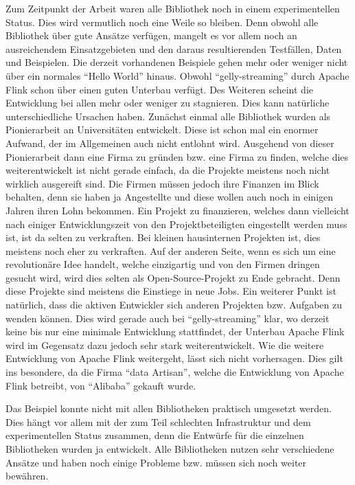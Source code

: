 Zum Zeitpunkt der Arbeit waren alle Bibliothek noch in einem experimentellen
Status. Dies wird vermutlich noch eine Weile so bleiben. Denn obwohl alle
Bibliothek über gute Ansätze verfügen, mangelt es vor allem noch an ausreichendem
Einsatzgebieten und den daraus resultierenden Testfällen, Daten und Beispielen.
Die derzeit vorhandenen Beispiele gehen mehr oder weniger nicht über ein normales
\enquote{Hello World} hinaus. Obwohl \enquote{gelly-streaming} durch Apache Flink
schon über einen guten Unterbau verfügt. Des Weiteren scheint die Entwicklung bei
allen mehr oder weniger zu stagnieren. Dies kann natürliche unterschiedliche
Ursachen haben. Zunächst einmal alle Bibliothek wurden als Pionierarbeit an
Universitäten entwickelt. Diese ist schon mal ein enormer Aufwand, der im
Allgemeinen auch nicht entlohnt wird. Ausgehend von dieser Pionierarbeit dann
eine Firma zu gründen bzw. eine Firma zu finden, welche dies weiterentwickelt ist
nicht gerade einfach, da die Projekte meistens noch nicht wirklich ausgereift
sind. Die Firmen müssen jedoch ihre Finanzen im Blick behalten, denn sie haben
ja Angestellte und diese wollen auch noch in einigen Jahren ihren Lohn
bekommen. Ein Projekt zu finanzieren, welches dann vielleicht nach einiger
Entwicklungszeit von den Projektbeteiligten eingestellt werden muss ist, ist da
selten zu verkraften. Bei kleinen hausinternen Projekten ist, dies meistens
noch eher zu verkraften. Auf der anderen Seite, wenn es sich um eine
revolutionäre Idee handelt, welche einzigartig und von den Firmen dringen gesucht
wird, wird dies selten als Open-Source-Projekt zu Ende gebracht. Denn diese
Projekte sind meistens die Einstiege in neue Jobs. Ein weiterer Punkt ist natürlich,
dass die aktiven Entwickler sich anderen Projekten bzw. Aufgaben zu wenden können.
Dies wird gerade auch bei \enquote{gelly-streaming} klar, wo derzeit keine bis
nur eine minimale Entwicklung stattfindet, der Unterbau Apache Flink wird
im Gegensatz dazu jedoch sehr stark weiterentwickelt. Wie die weitere Entwicklung
von Apache Flink weitergeht, lässt sich nicht vorhersagen. Dies gilt ins
besondere, da die Firma \enquote{data Artisan}, welche die Entwicklung von
Apache Flink betreibt, von \enquote{Alibaba} gekauft wurde.

Das Beispiel konnte nicht mit allen Bibliotheken praktisch umgesetzt werden. Dies
hängt vor allem mit der zum Teil schlechten Infrastruktur und dem experimentellen
Status zusammen, denn die Entwürfe für die einzelnen Bibliotheken wurden ja
entwickelt. Alle Bibliotheken nutzen sehr verschiedene Ansätze und haben noch
einige Probleme bzw. müssen sich noch weiter bewähren.

